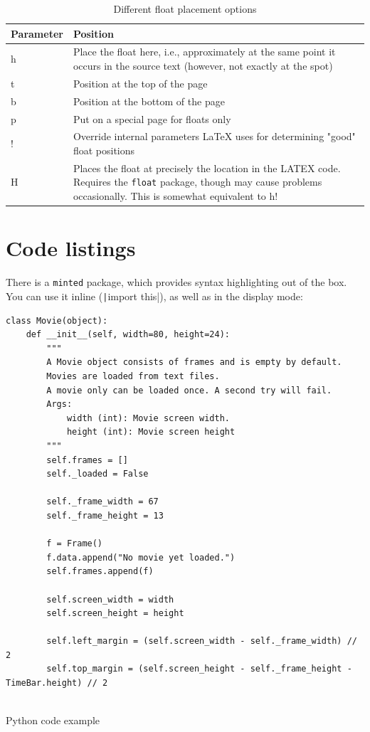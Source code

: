 \documentclass[a4paper]{article}
\begin{document}
\begin{table}[H]
\begin{tabularx}{\textwidth}{l|X}
    \textbf{Parameter} & \textbf{Position} \\
    \hline
    h & Place the float here, i.e., approximately at the same point it occurs in the source text (however, not exactly at the spot) \\
    \hline
    t & Position at the top of the page \\
    \hline
    b & Position at the bottom of the page \\
    \hline
    p & Put on a special page for floats only \\
    \hline
    ! & Override internal parameters LaTeX uses for determining "good" float positions \\
    \hline
    H & Places the float at precisely the location in the LATEX code. Requires the \texttt{float} package, though may cause problems occasionally. This is somewhat equivalent to h!\\
\end{tabularx}
\caption{Different float placement options}
\label{tab:float_placement}
\end{table}

\section{Code listings}

There is a \texttt{minted} package, which provides syntax highlighting out of the box. You can use it inline (\texttt|import this|), as well as in the display mode:

\begin{listing}[H]
\begin{verbatim}
class Movie(object):
    def __init__(self, width=80, height=24):
        """
        A Movie object consists of frames and is empty by default.
        Movies are loaded from text files.
        A movie only can be loaded once. A second try will fail.
        Args:
            width (int): Movie screen width.
            height (int): Movie screen height
        """
        self.frames = []
        self._loaded = False

        self._frame_width = 67
        self._frame_height = 13

        f = Frame()
        f.data.append("No movie yet loaded.")
        self.frames.append(f)

        self.screen_width = width
        self.screen_height = height

        self.left_margin = (self.screen_width - self._frame_width) // 2
        self.top_margin = (self.screen_height - self._frame_height - TimeBar.height) // 2
    
\end{verbatim}
\caption{Python code example}
\end{listing}
\end{document}
